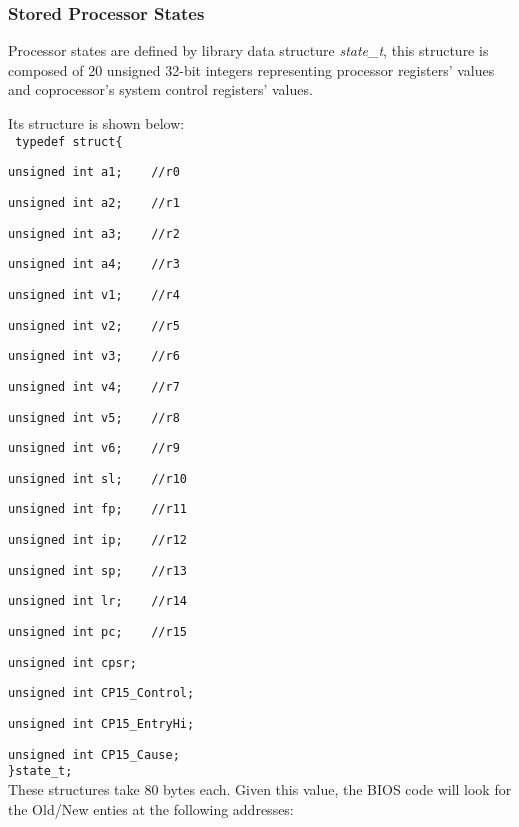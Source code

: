 \subsubsection{Stored Processor States}
Processor states are defined by library data structure \emph{state\_t}, this structure is composed of 20 unsigned 32-bit integers representing processor registers' values and coprocessor's system control registers' values. 

Its structure is shown below:
\nopagebreak
\\
\texttt{ typedef struct\{}

\nopagebreak
\texttt{unsigned int a1;\ \ \ \ //r0}

\nopagebreak
\texttt{unsigned int a2;\ \ \ \ //r1}

\nopagebreak
\texttt{unsigned int a3;\ \ \ \ //r2}

\nopagebreak
\texttt{unsigned int a4;\ \ \ \ //r3}

\nopagebreak
\texttt{unsigned int v1;\ \ \ \ //r4}

\nopagebreak
\texttt{unsigned int v2;\ \ \ \ //r5}

\nopagebreak
\texttt{unsigned int v3;\ \ \ \ //r6}

\nopagebreak
\texttt{unsigned int v4;\ \ \ \ //r7}

\nopagebreak
\texttt{unsigned int v5;\ \ \ \ //r8}

\nopagebreak
\texttt{unsigned int v6;\ \ \ \ //r9}

\nopagebreak
\texttt{unsigned int sl;\ \ \ \ //r10}

\nopagebreak
\texttt{unsigned int fp;\ \ \ \ //r11}

\nopagebreak
\texttt{unsigned int ip;\ \ \ \ //r12}

\nopagebreak
\texttt{unsigned int sp;\ \ \ \ //r13}

\nopagebreak
\texttt{unsigned int lr;\ \ \ \ //r14}

\nopagebreak
\texttt{unsigned int pc;\ \ \ \ //r15}

\nopagebreak
\texttt{unsigned int cpsr;}

\nopagebreak
\texttt{unsigned int CP15\_Control;}

\nopagebreak
\texttt{unsigned int CP15\_EntryHi;}

\nopagebreak
\texttt{unsigned int CP15\_Cause;}\\
\nopagebreak
\texttt{\}state\_t; }
\\

These structures take 80 bytes each. Given this value, the BIOS code will look for the Old/New enties at the following addresses:
\\

